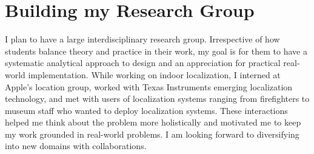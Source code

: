 \documentclass[10pt]{article}
\begin{document}

\section{Building my Research Group}
I plan to have a large interdisciplinary research group. Irrespective of how students balance theory and practice in their work, my goal is for them to have a systematic analytical approach to design and an appreciation for practical real-world implementation. While working on indoor localization, I interned at Apple's location group, worked with Texas Instruments emerging localization technology, and met with users of localization systems ranging from firefighters to museum staff who wanted to deploy localization systems. These interactions helped me think about the problem more holistically and motivated me to keep my work grounded in real-world problems. I am looking forward to diversifying into new domains with collaborations.  \\
\end{document}
